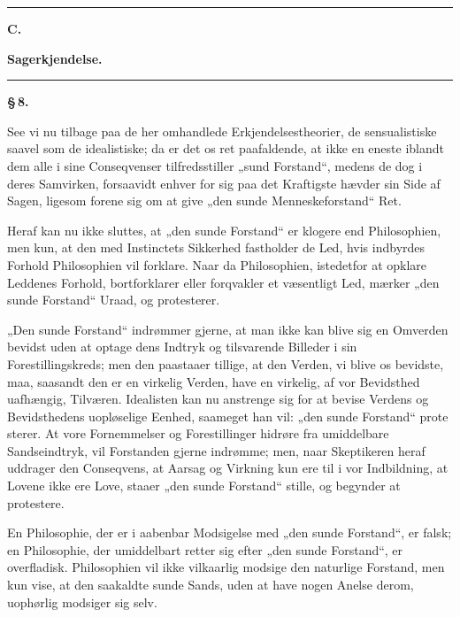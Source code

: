 \documentclass[12pt]{book}
\newcommand{\opage}[1]{\marginnote{\footnotesize\textit{[#1]}}}
\begin{document}
\begin{center}\rule{2.5cm}{0.4pt}\end{center}

\begin{center}
  {\large\bfseries C.}\par\vspace{2pt}
  {\bfseries Sagerkjendelse.}\par\vspace{4pt}
  \rule{2cm}{0.4pt}
\end{center}
{}

\begin{center}{\bfseries \S\,8.}\end{center}

\noindent See vi nu tilbage paa de her omhandlede Erkjendelsestheorier, de
sensualistiske saavel som de idealistiske; da er det os ret paafaldende, at ikke en
eneste iblandt dem alle i sine Conseqvenser tilfredsstiller „sund Forstand“, medens
de dog i deres Samvirken, forsaavidt enhver for sig paa det Kraftigste hævder sin
Side af Sagen, ligesom forene sig om at give „den sunde Menneskeforstand“ Ret.

Heraf kan nu ikke sluttes, at „den sunde Forstand“ er klogere end Philosophien, men
kun, at den med Instinctets Sikkerhed fastholder de Led, hvis indbyrdes Forhold
Philosophien vil forklare. Naar da Philosophien, istedetfor at opklare Leddenes
Forhold, bortforklarer eller forqvakler et væsentligt Led, mærker „den sunde
Forstand“ Uraad, og protesterer.

„Den sunde Forstand“ indrømmer gjerne, at man ikke kan blive sig en Omverden bevidst
uden at optage dens Indtryk og tilsvarende Billeder i sin Forestillingskreds; men
den paastaaer tillige, at den Verden, vi blive os bevidste, maa, saasandt den er en
virkelig Verden, have en virkelig, af vor Bevidsthed uafhængig, Tilværen.
Idealisten kan nu anstrenge sig for at bevise Verdens og Bevidsthedens uopløselige
Eenhed, saameget han vil: „den sunde Forstand“ prote%
\opage{41}sterer. At vore Fornemmelser og Forestillinger hidrøre fra umiddelbare
Sandseindtryk, vil Forstanden gjerne indrømme; men, naar Skeptikeren heraf uddrager
den Conseqvens, at Aarsag og Virkning kun ere til i vor Indbildning, at Lovene ikke
ere Love, staaer „den sunde Forstand“ stille, og begynder at protestere.

En Philosophie, der er i aabenbar Modsigelse med „den sunde Forstand“, er falsk; en
Philosophie, der umiddelbart retter sig efter „den sunde Forstand“, er overfladisk.
Philosophien vil ikke vilkaarlig modsige den naturlige Forstand, men kun vise, at den
saakaldte sunde Sands, uden at have nogen Anelse derom, uophørlig modsiger sig selv.
\end{document}
